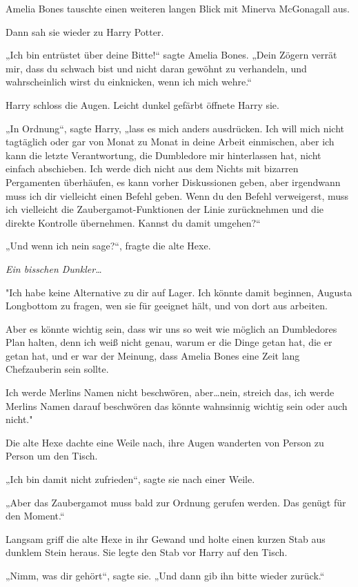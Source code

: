 {Amelia Bones tauschte einen weiteren langen Blick mit Minerva McGonagall aus.

Dann sah sie wieder zu Harry Potter.

„Ich bin entrüstet über deine Bitte!“ sagte Amelia Bones. „Dein Zögern verrät mir, dass du schwach bist und nicht daran gewöhnt zu verhandeln, und wahrscheinlich wirst du einknicken, wenn ich mich wehre.“

Harry schloss die Augen. Leicht dunkel gefärbt öffnete Harry sie.

„In Ordnung“, sagte Harry, „lass es mich anders ausdrücken. Ich will mich nicht tagtäglich oder gar von Monat zu Monat in deine Arbeit einmischen, aber ich kann die letzte Verantwortung, die Dumbledore mir hinterlassen hat, nicht einfach abschieben. Ich werde dich nicht aus dem Nichts mit bizarren Pergamenten überhäufen, es kann vorher Diskussionen geben, aber irgendwann muss ich dir vielleicht einen Befehl geben. Wenn du den Befehl verweigerst, muss ich vielleicht die Zaubergamot-Funktionen der Linie zurücknehmen und die direkte Kontrolle übernehmen. Kannst du damit umgehen?“

„Und wenn ich nein sage?“, fragte die alte Hexe.

\emph{Ein bisschen Dunkler…}

"Ich habe keine Alternative zu dir auf Lager. Ich könnte damit beginnen, Augusta Longbottom zu fragen, wen sie für geeignet hält, und von dort aus arbeiten.

Aber es könnte wichtig sein, dass wir uns so weit wie möglich an Dumbledores Plan halten, denn ich weiß nicht genau, warum er die Dinge getan hat, die er getan hat, und er war der Meinung, dass Amelia Bones eine Zeit lang Chefzauberin sein sollte.

Ich werde Merlins Namen nicht beschwören, aber…nein, streich das, ich werde Merlins Namen darauf beschwören das könnte wahnsinnig wichtig sein oder auch nicht."

Die alte Hexe dachte eine Weile nach, ihre Augen wanderten von Person zu Person um den Tisch.

„Ich bin damit nicht zufrieden“, sagte sie nach einer Weile.

„Aber das Zaubergamot muss bald zur Ordnung gerufen werden. Das genügt für den Moment.“

Langsam griff die alte Hexe in ihr Gewand und holte einen kurzen Stab aus dunklem Stein heraus. Sie legte den Stab vor Harry auf den Tisch.

„Nimm, was dir gehört“, sagte sie. „Und dann gib ihn bitte wieder zurück.“

}
